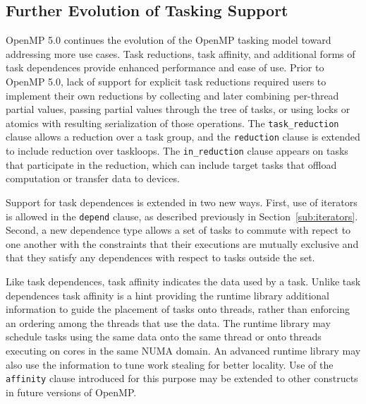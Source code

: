 \subsection{Further Evolution of Tasking Support}
\label{sub:new_tasking}


OpenMP 5.0 continues the evolution of the OpenMP tasking model toward 
addressing more use cases.  Task reductions, task affinity, and 
additional forms of task dependences provide enhanced performance and 
ease of use.  Prior to OpenMP 5.0, lack of support for explicit task 
reductions required users to implement their own reductions by 
collecting and later combining per-thread partial values, passing 
partial values through the tree of tasks, or using locks or atomics 
with resulting serialization of those operations.  The 
\texttt{task\_reduction} clause allows a reduction over a task group, 
and the \texttt{reduction} clause is extended to include reduction 
over taskloops.  The \texttt{in\_reduction} clause appears on tasks that 
participate in the reduction, which can include target tasks that 
offload computation or transfer data to devices.

Support for task dependences is extended in two new ways.  First, use 
of iterators is allowed in the \texttt{depend} clause, as described 
previously in Section~\ref{sub:iterators}. Second, a new dependence type 
allows a set of tasks to commute with repect to one another with the 
constraints that their executions are mutually exclusive and that 
they satisfy any dependences with respect to tasks outside the set.

Like task dependences, task affinity indicates the data used by a task. 
Unlike task dependences task affinity is a hint providing the runtime 
library additional information to guide the placement of tasks onto 
threads, rather than enforcing an ordering among the threads that use 
the data.  The runtime library may schedule tasks using the same data 
onto the same thread or onto threads executing on cores in the same 
NUMA  domain.  An advanced runtime library may also use the information 
to tune work stealing for better locality. Use of the \texttt{affinity} 
clause introduced for this purpose may be extended to other constructs 
in future versions of OpenMP.

